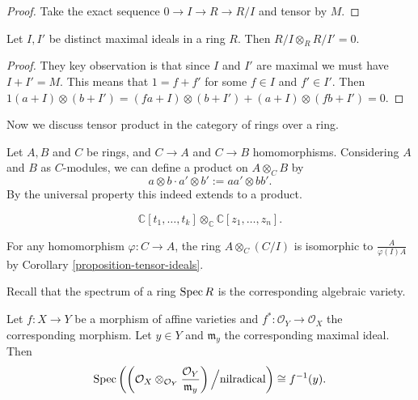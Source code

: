 \begin{proof}
Take the exact sequence $0 \to I \to R \to
R/I$ and tensor
by $M$.
\end{proof}

\begin{exercise}
\label{exercise-tensor-product-maximal-ideal}
Let $I,I'$ be distinct maximal ideals in a
ring $R$.
Then $R/I \otimes_R R/I'=0$.
\end{exercise}

\begin{proof}
They key observation is that since $I$ and
$I'$
are maximal we must have $I+I'=M$.
This means that $1=f+f'$ for some $f \in I$
and $f' \in I'$.
Then
$1(a+I)\otimes(b+I')
=(fa+I) \otimes (b + I')
+(a+I)\otimes(fb+I')=0$.
\end{proof}

\medskip\noindent
Now we discuss tensor product in the category
of rings over a ring.

\begin{definition}
\label{definition-tensor-product-of-rings}
Let $A,B$ and $C$ be rings, and
$C \to A$ and $C \to B$ homomorphisms.
Considering $A$ and $B$ as $C$-modules,
we can define a product on $A \otimes_C B$ by
$$
a \otimes b \cdot a' \otimes b':=a a' \otimes
b b'.
$$
By the universal property this indeed extends
to a product.
\end{definition}

\begin{example}
\label{example-tensor-product-of-fg-algebras}
$$
\mathbb{C}[t_1,…,t_k] \otimes_\mathbb{C}
\mathbb{C}[z_1,…,z_n].
$$
\end{example}

\begin{example}
\label{example-tenso-produ-rings-ring}
For any homomorphism $\varphi:C \to A$,
the ring $A \otimes_C(C/I)$ is isomorphic to
$\frac{A}{\varphi(I)A}$
by Corollary
\ref{proposition-tensor-ideals}.
\end{example}

\noindent
Recall that the spectrum of a ring $\mathop{\mathrm{Spec}} R$
is the corresponding algebraic variety.

\begin{proposition}
\label{proposition-preimage-of-point}
Let $f:X \to Y$ be a morphism of affine
varieties
and $f^*:\mathcal{O}_Y \to \mathcal{O}_X$ the
corresponding morphism.
Let $y \in Y$ and $\mathfrak{m}_y$ the
corresponding maximal ideal.
Then
$$
\mathop{\mathrm{Spec}}\left(
\left(\mathcal{O}_X \otimes_{\mathcal{O}_Y}
\frac{\mathcal{O}_Y}{\mathfrak{m}_y}\right)
\Big/\text{nilradical}\right)
\cong f^{-1}(y).
$$
\end{proposition}

